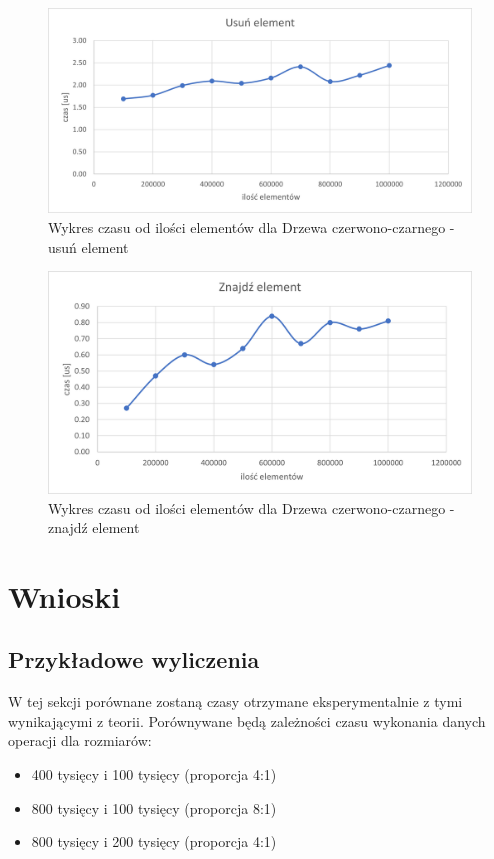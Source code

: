 \documentclass{article}
\begin{document}
    \begin{figure}[H]
        \centering
        \includegraphics[scale = 0.85]{wykresy/rbt/remove.png}
        \caption{Wykres czasu od ilości elementów dla Drzewa czerwono-czarnego - usuń element}
    \end{figure}
    
    \begin{figure}[H]
        \centering
        \includegraphics[scale = 0.85]{wykresy/rbt/find.png}
        \caption{Wykres czasu od ilości elementów dla Drzewa czerwono-czarnego - znajdź element}
    \end{figure}  


\section{Wnioski}
    \subsection{Przykładowe wyliczenia}
        W tej sekcji porównane zostaną czasy otrzymane eksperymentalnie z tymi wynikającymi z teorii. Porównywane będą zależności
        czasu wykonania danych operacji dla rozmiarów:
        \begin{itemize}
            \item 400 tysięcy i 100 tysięcy (proporcja 4:1)
            \item 800 tysięcy i 100 tysięcy (proporcja 8:1)
            \item 800 tysięcy i 200 tysięcy (proporcja 4:1)
        \end{itemize}
\end{document}
